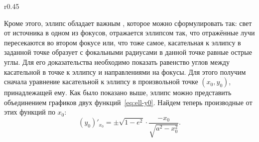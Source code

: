 \begin{wrapfigure}{r}{0.45\tw}
    \centering
    \caption{}
    \label{pic:ellipse-optic-property}
\end{wrapfigure}
Кроме этого, эллипс обладает важным , которое можно сформулировать так: свет от источника в одном из фокусов, отражается эллипсом так, что отражённые лучи пересекаются во втором фокусе или, что тоже самое, касательная к эллипсу в заданной точке образует с фокальными радиусами в данной точке равные острые углы. Для его доказательства необходимо показать равенство углов между касательной в точке к эллипсу и направлениями на фокусы. Для этого получим сначала уравнение касательной к эллипсу в произвольной точке $(x_0, y_0)$, принадлежащей ему. Как было показано выше, эллипс можно представить объединением графиков двух функций~\eqref{eq:ell-y0}. Найдем теперь производные от этих функций по $x_0$:
\begin{equation*}
    (y_0)'_{x_0} = \pm \sqrt{1 - e^2} \cdot \frac{-x_0}{\sqrt{a^2 - x_0^2}}.
\end{equation*}

